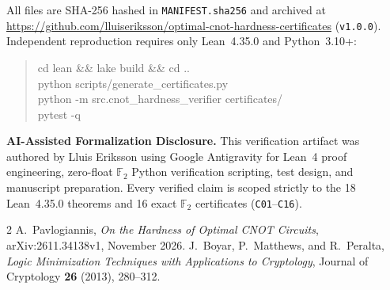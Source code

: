 \documentclass[10pt,twocolumn]{article}
\begin{document}
All files are SHA-256 hashed in \texttt{MANIFEST.sha256} and archived at \url{https://github.com/lluiseriksson/optimal-cnot-hardness-certificates} (\texttt{v1.0.0}). Independent reproduction requires only Lean~4.35.0 and Python~3.10+:
\begin{quote}\raggedright\footnotesize\ttfamily
cd lean \&\& lake build \&\& cd ..\\
python scripts/generate\_certificates.py\\
python -m src.cnot\_hardness\_verifier certificates/\\
pytest -q
\end{quote}
\noindent\textbf{AI-Assisted Formalization Disclosure.} This verification artifact was authored by Lluis Eriksson using Google Antigravity for Lean~4 proof engineering, zero-float $\mathbb{F}_2$ Python verification scripting, test design, and manuscript preparation. Every verified claim is scoped strictly to the 18 Lean~4.35.0 theorems and 16 exact $\mathbb{F}_2$ certificates (\texttt{C01}--\texttt{C16}).

\begin{thebibliography}{2}
A.~Pavlogiannis,
\emph{On the Hardness of Optimal CNOT Circuits},
arXiv:2611.34138v1, November 2026.
J.~Boyar, P.~Matthews, and R.~Peralta,
\emph{Logic Minimization Techniques with Applications to Cryptology},
Journal of Cryptology \textbf{26} (2013), 280--312.
\end{thebibliography}
\end{document}
